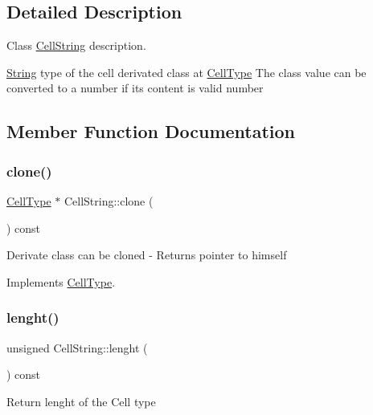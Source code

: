 \subsection{Detailed Description}
Class \hyperlink{class_cell_string}{Cell\+String} description. 

\hyperlink{class_string}{String} type of the cell derivated class at \hyperlink{class_cell_type}{Cell\+Type} The class value can be converted to a number if it\textquotesingle{}s content is valid number 

\subsection{Member Function Documentation}
\mbox{\label{class_cell_string_a293639128fa52df8f72f88335e23d2f0}} 
\subsubsection{\texorpdfstring{clone()}{clone()}}
{\footnotesize\ttfamily \hyperlink{class_cell_type}{Cell\+Type} $\ast$ Cell\+String\+::clone (\begin{DoxyParamCaption}{ }\end{DoxyParamCaption}) const\hspace{0.3cm}{\ttfamily [virtual]}}

Derivate class can be cloned -\/ Returns pointer to himself 

Implements \hyperlink{class_cell_type_a8c534b1eed27659429f761fc76d51b89}{Cell\+Type}.

\mbox{\label{class_cell_string_a6a8f5570104283eb4bb8e9ed4b998fb7}} 
\subsubsection{\texorpdfstring{lenght()}{lenght()}}
{\footnotesize\ttfamily unsigned Cell\+String\+::lenght (\begin{DoxyParamCaption}{ }\end{DoxyParamCaption}) const\hspace{0.3cm}{\ttfamily [virtual]}}

Return lenght of the Cell type 

